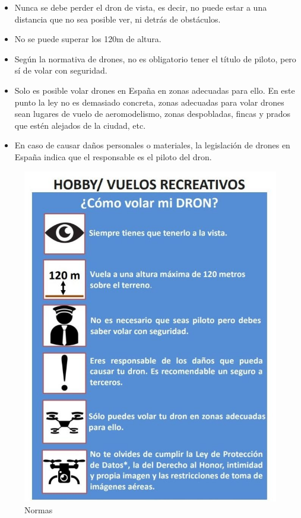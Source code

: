 \begin{itemize}
\item Nunca se debe perder el dron de vista, es decir, no puede estar a una distancia que no sea posible ver, ni detrás de obstáculos.
\item No se puede superar los 120m de altura.
\item Según la normativa de drones, no es obligatorio tener el título de piloto, pero sí de volar con seguridad.
\item Solo es posible volar drones en España en zonas adecuadas para ello. En este punto la ley no es demasiado concreta, zonas adecuadas para volar drones sean lugares de vuelo de aeromodelismo, zonas despobladas, fincas y prados que estén alejados de la ciudad, etc.
\item En caso de causar daños personales o materiales, la legislación de drones en España indica que el responsable es el piloto del dron.

\end{itemize}
\begin{figure}[H]
  \centering
  \includegraphics[scale=0.3]{imagenes/normas.jpg}
  \caption{Normas}
  \label{fig:normas}
\end{figure}

